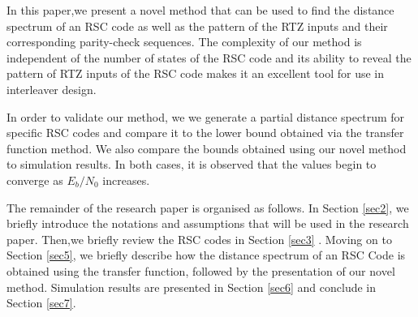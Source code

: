 In this paper,we present a novel method that can be used to find the distance spectrum of an RSC code as well as the pattern of the RTZ inputs and their corresponding parity-check sequences. The complexity of our method is independent of the number of states of the RSC code and its ability to reveal the pattern of RTZ inputs of the RSC code makes it an excellent tool for use in interleaver design.

In order to validate our method, we  we generate a partial distance spectrum for specific RSC codes and compare it to the lower bound obtained via the transfer function method. We also compare the bounds obtained using our novel method to simulation results. In both cases, it is observed that the values begin to converge as $E_b/N_0$ increases.

The remainder of the research paper is organised as follows. In Section \ref{sec2}, we briefly introduce the notations and assumptions that will be used in the research paper. Then,we briefly review the RSC codes in Section \ref{sec3} . Moving on to Section \ref{sec5}, 
we briefly describe how the distance spectrum of an RSC Code is obtained using the transfer function, followed by the presentation of our novel method. Simulation results are presented in Section \ref{sec6} and conclude in Section \ref{sec7}.